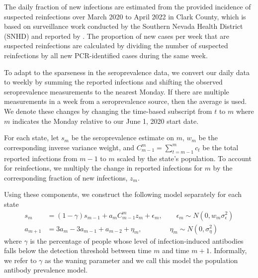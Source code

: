 \documentclass{article}
\begin{document}
The daily fraction of new infections are estimated from the provided incidence
of suspected reinfections over March 2020 to April 2022 in Clark County, which
is based on surveillance work conducted by the Southern Nevada Health District
(SNHD) and reported by \citet{ruff2022rapid}. The proportion of new cases per
week that are suspected reinfections are calculated by dividing the number of
suspected reinfections by all new PCR-identified cases during the same week. 

 
To adapt to the sparseness in the seroprevalence data, we convert our daily data
to weekly by summing the reported infections and shifting the observed
seroprevalence measurements to the nearest Monday. If there are multiple
measurements in a week from a seroprevalence source, then the average is used.
We denote these changes by changing the time-based subscript from $t$ to $m$
where $m$ indicates the Monday relative to our June 1, 2020 start date.

For each state, let $s_m$ be the seroprevalence estimate on $m$, $w_m$ be the
corresponding inverse variance weight, and $C_{m-1}^m = \sum_{t = m-1}^{m} c_t$
be the total reported infections from $m-1$ to $m$ scaled by the state's
population. To account for reinfections, we multiply the change in reported
infections for $m$ by the corresponding fraction of new infections, $z_m$. 

Using these components, we construct the following model separately for each state
\begin{align}
s_m &= (1 -\gamma)s_{m-1} + a_m C_{m-1}^m z_m + \epsilon_m, \qquad \epsilon_m 
\sim N(0, w_m \sigma^2_\epsilon) \label{eq:waningpr}  \\
a_{m+1} &= 3a_{m} - 3a_{m-1} + a_{m-2} + \eta_m,\qquad\qquad \eta_m 
\sim N(0, \sigma^2_{\eta})   \nonumber
\end{align}
where $\gamma$ is the percentage of people whose level of infection-induced
antibodies falls below the detection threshold between time $m$ and time $m+1$.
Informally, we refer to $\gamma$ as the waning parameter and we call this model
the population antibody prevalence model. 
\end{document}
